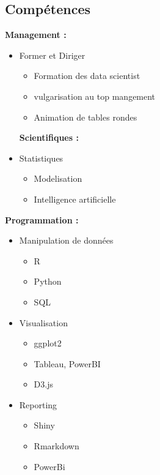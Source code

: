 \documentclass[]{article}
\providecommand{\tightlist}{%
  \setlength{\itemsep}{0pt}\setlength{\parskip}{0pt}}
\begin{document}
\hypertarget{skills}{%
\subsection{Compétences}\label{skills}}

\textbf{Management :}

\begin{itemize}
\tightlist
\item
  Former et Diriger

  \begin{itemize}
  \tightlist
  \item
    Formation des data scientist
  \item
    vulgarisation au top mangement
  \item
    Animation de tables rondes
  \end{itemize}

  \textbf{Scientifiques :}
\item
  Statistiques

  \begin{itemize}
  \tightlist
  \item
    Modelisation
  \item
    Intelligence artificielle
  \end{itemize}
\end{itemize}

\textbf{Programmation :}

\begin{itemize}
\tightlist
\item
  Manipulation de données

  \begin{itemize}
  \tightlist
  \item
    R
  \item
    Python
  \item
    SQL
  \end{itemize}
\item
  Visualisation

  \begin{itemize}
  \tightlist
  \item
    ggplot2
  \item
    Tableau, PowerBI
  \item
    D3.js
  \end{itemize}
\item
  Reporting

  \begin{itemize}
  \tightlist
  \item
    Shiny
  \item
    Rmarkdown
  \item
    PowerBi
  \end{itemize}
\end{itemize}
\end{document}

